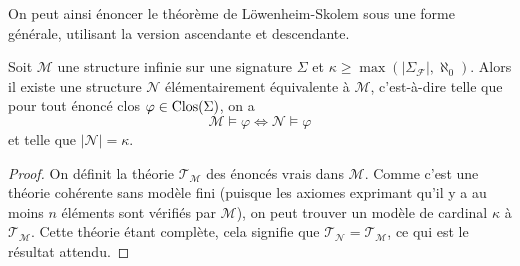 On peut ainsi énoncer le théorème de Löwenheim-Skolem sous une forme générale,
utilisant la version ascendante et descendante.

\begin{theorem}
  Soit $\mathcal M$ une structure infinie sur une signature $\Sigma$ et
  $\kappa \geq \max(|\Sigma_{\mathcal F}|,\aleph_0)$. Alors il existe une
  structure $\mathcal N$ élémentairement équivalente à $\mathcal M$,
  c'est-à-dire telle que pour tout énoncé clos $\varphi\in\operatorname{Clos}(\Sigma)$, on a
  \[\mathcal M \models \varphi \iff \mathcal N \models \varphi\]
  et telle que $|\mathcal N| = \kappa$.
\end{theorem}

\begin{proof}
  On définit la théorie $\mathcal T_{\mathcal M}$ des énoncés vrais dans
  $\mathcal M$. Comme c'est une théorie cohérente sans modèle fini (puisque
  les axiomes exprimant qu'il y a au moins $n$ éléments sont vérifiés par
  $\mathcal M$), on peut trouver un modèle de cardinal $\kappa$ à
  $\mathcal T_{\mathcal M}$. Cette théorie étant complète, cela signifie que
  $\mathcal T_{\mathcal N} = \mathcal T_{\mathcal M}$, ce qui est le
  résultat attendu.
\end{proof}
